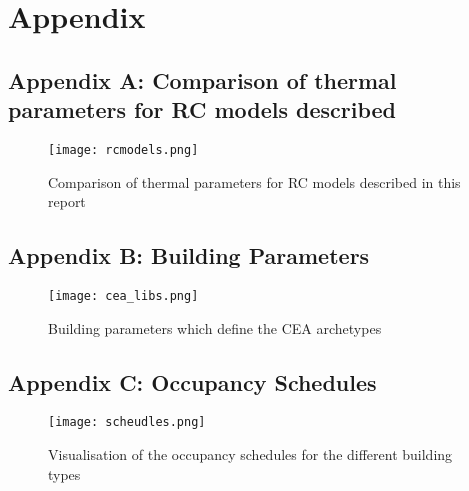 
\chapter{Appendix}

\section*{Appendix A: Comparison of thermal parameters for RC models described}
\label{app: }

\begin{figure}[ht] %
  \begin{center}
    \texttt{[image: rcmodels.png]}
    \caption{Comparison of thermal parameters for RC models described in this report}
    \label{fig: Comparison of thermal parameters for RC models described}
  \end{center} 
\end{figure}

\section*{Appendix B: Building Parameters}
\label{app: }

\begin{figure}[h] %
  \begin{center}
    \texttt{[image: cea\_libs.png]}
    \caption{Building parameters which define the CEA archetypes}
    \label{fig: cealibs}
  \end{center} 
\end{figure}


\section*{Appendix C: Occupancy Schedules}
\label{app: }

\begin{figure}[h] %
  \begin{center}
    \texttt{[image: scheudles.png]}
    \caption{Visualisation of the occupancy schedules for the different building types}
    \label{fig: schedules}
  \end{center} 
\end{figure}

